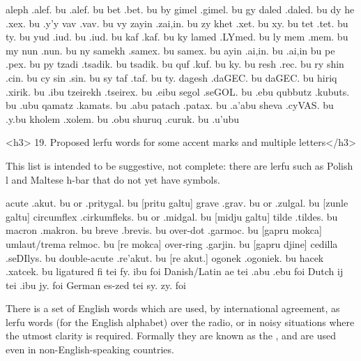 aleph       .alef. bu       .alef. bu
    bet     .bet. bu        by
    gimel       .gimel. bu      gy
    daled       .daled. bu      dy
    he      .xex. bu        .y'y
    vav     .vav. bu        vy
    zayin       .zai,in. bu     zy
    khet        .xet. bu        xy. bu
    tet     .tet. bu        ty. bu
    yud     .iud. bu        .iud. bu
    kaf     .kaf. bu        ky
    lamed       .LYmed. bu      ly
    mem     .mem. bu        my
    nun     .nun. bu        ny
    samekh      .samex. bu      samex. bu
    ayin        .ai,in. bu      .ai,in bu
    pe      .pex. bu        py
    tzadi       .tsadik. bu     tsadik. bu
    quf     .kuf. bu        ky. bu
    resh        .rec. bu        ry
    shin        .cin. bu        cy
    sin     .sin. bu        sy
    taf     .taf. bu        ty.
    dagesh      .daGEC. bu      daGEC. bu
    hiriq       .xirik. bu      .ibu
    tzeirekh    .tseirex. bu        .eibu
    segol       .seGOL. bu      .ebu
    qubbutz     .kubuts. bu     .ubu
    qamatz      .kamats. bu     .abu
    patach      .patax. bu      .a'abu
    sheva       .cyVAS. bu      .y.bu
    kholem      .xolem. bu      .obu
    shuruq      .curuk. bu      .u'ubu

<h3>
19. Proposed lerfu words for some accent marks and multiple
    letters</h3>

This list is intended to be suggestive, not complete: there
    are lerfu such as Polish  l and Maltese h-bar that do
    not yet have symbols.

   acute       .akut. bu or
                .pritygal. bu   [pritu galtu]
    grave       .grav. bu
                or .zulgal. bu  [zunle galtu]
    circumflex  .cirkumfleks. bu
                or .midgal. bu  [midju galtu]
    tilde       .tildes. bu
    macron      .makron. bu
    breve       .brevis. bu
    over-dot    .garmoc. bu     [gapru mokca]
    umlaut/trema    relmoc. bu      [re mokca]
    over-ring   .garjin. bu     [gapru djine]
    cedilla     .seDIlys. bu
    double-acute    .re'akut. bu        [re akut.]
    ogonek      .ogoniek. bu
    hacek       .xatcek. bu
    ligatured fi    tei fy. ibu foi
    Danish/Latin ae tei .abu .ebu foi
    Dutch ij    tei .ibu jy. foi
    German es-zed   tei sy. zy. foi



There is a set of English words which are used, by
    international agreement, as lerfu words (for the English
    alphabet) over the radio, or in noisy situations where the
    utmost clarity is required. Formally they are known as the
    , and are used even in
    non-English-speaking countries.

